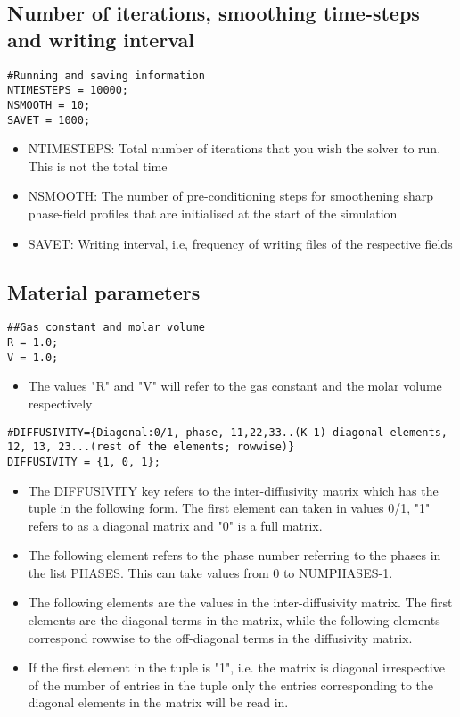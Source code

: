 \documentclass[a4paper,10pt]{article}
\begin{document}
\subsection{Number of iterations, smoothing time-steps and writing interval}

\begin{lstlisting}
#Running and saving information
NTIMESTEPS = 10000;
NSMOOTH = 10;
SAVET = 1000;
\end{lstlisting}

\begin{itemize}
 \item NTIMESTEPS: Total number of iterations that you wish the solver to run. This is not the total time
 \item NSMOOTH: The number of pre-conditioning steps for smoothening sharp phase-field profiles that are initialised at the start of the simulation
 \item SAVET: Writing interval, i.e, frequency of writing files of the respective fields
\end{itemize}

\subsection{Material parameters}

\begin{lstlisting}
##Gas constant and molar volume
R = 1.0;
V = 1.0;
\end{lstlisting}

\begin{itemize}
 \item The values "R" and "V" will refer to the gas constant and the molar volume respectively 
\end{itemize}

\begin{lstlisting}
#DIFFUSIVITY={Diagonal:0/1, phase, 11,22,33..(K-1) diagonal elements, 12, 13, 23...(rest of the elements; rowwise)}
DIFFUSIVITY = {1, 0, 1};
\end{lstlisting}

\begin{itemize}
 \item The DIFFUSIVITY key refers to the inter-diffusivity matrix which has the tuple in the following form. The first element can taken in values 0/1, "1" refers to as a diagonal matrix and "0" is a full matrix.
 \item The following element refers to the phase number referring to the phases in the list PHASES. This can take values from 0 to NUMPHASES-1.
 \item The following elements are the values in the inter-diffusivity matrix. The first elements are the diagonal terms in the matrix, while the following 
 elements correspond rowwise to the off-diagonal terms in the diffusivity matrix.
 \item If the first element in the tuple is "1", i.e. the matrix is diagonal irrespective of the number of entries in the tuple only the entries 
 corresponding to the diagonal elements in the matrix will be read in.
\end{itemize}
\end{document}
